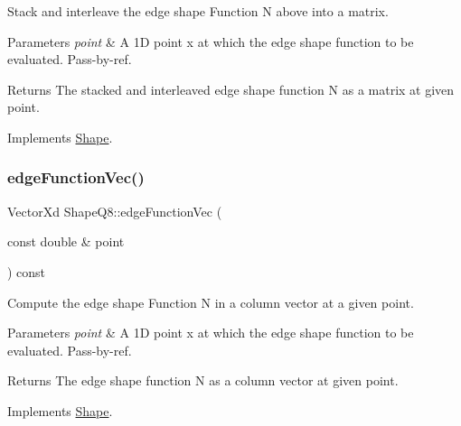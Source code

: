 Stack and interleave the edge shape Function N above into a matrix. 


\begin{DoxyParams}{Parameters}
{\em point} & A 1D point x at which the edge shape function to be evaluated. Pass-\/by-\/ref. \\
\hline
\end{DoxyParams}
\begin{DoxyReturn}{Returns}
The stacked and interleaved edge shape function N as a matrix at given point. 
\end{DoxyReturn}


Implements \mbox{\hyperlink{class_shape_ac9854f15377ea07c97be16049e3058d5}{Shape}}.

\mbox{\label{class_shape_q8_a6d5e89cd06d6639e599215686553adbe}} 
\subsubsection{\texorpdfstring{edge\+Function\+Vec()}{edgeFunctionVec()}}
{\footnotesize\ttfamily Vector\+Xd Shape\+Q8\+::edge\+Function\+Vec (\begin{DoxyParamCaption}\item[{const double \&}]{point }\end{DoxyParamCaption}) const\hspace{0.3cm}{\ttfamily [virtual]}}



Compute the edge shape Function N in a column vector at a given point. 


\begin{DoxyParams}{Parameters}
{\em point} & A 1D point x at which the edge shape function to be evaluated. Pass-\/by-\/ref. \\
\hline
\end{DoxyParams}
\begin{DoxyReturn}{Returns}
The edge shape function N as a column vector at given point. 
\end{DoxyReturn}


Implements \mbox{\hyperlink{class_shape_aeb6b5b956ca89b571d17ee7e140bb689}{Shape}}.

\mbox{\label{class_shape_q8_a49ab65aee22c0b8df4b9cb24b973a882}} 
